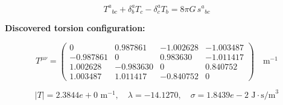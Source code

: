 
\begin{equation}
  T^a{}_{bc} + \delta^a_b T_c - \delta^a_c T_b = 8\pi G \, s^a{}_{bc}
\end{equation}

\textbf{Discovered torsion configuration:}

\begin{equation}
  T^{\mu\nu} = \begin{pmatrix}
    0 & 0.987861 & -1.002628 & -1.003487 \\
    -0.987861 & 0 & 0.983630 & -1.011417 \\
    1.002628 & -0.983630 & 0 & 0.840752 \\
    1.003487 & 1.011417 & -0.840752 & 0
  \end{pmatrix} \quad \text{m}^{-1}
\end{equation}

\begin{equation}
  |T| = 2.3844e+0 \text{ m}^{-1}, \quad
  \lambda = -14.1270, \quad
  \sigma = 1.8439e-2 \text{ J}\cdot\text{s/m}^3
\end{equation}